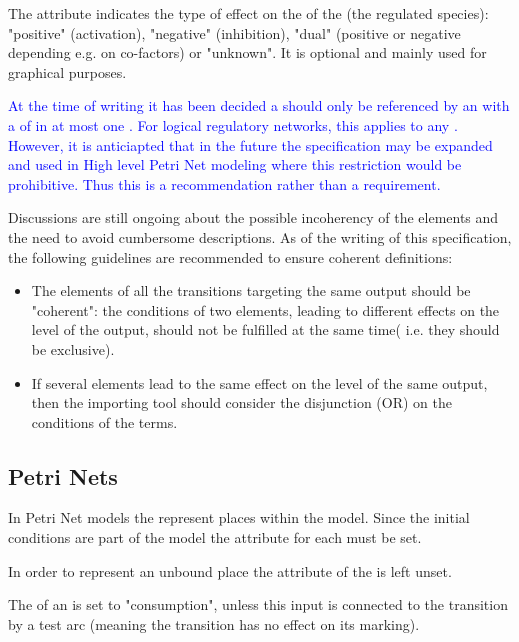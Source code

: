 The  attribute indicates the type of effect on the \Output of the \Transition (the regulated species): "positive" (activation), "negative" (inhibition), "dual" (positive or negative depending e.g. on co-factors) or "unknown". It is optional and mainly used for graphical purposes.


\textcolor{blue}{At the time of writing it has been decided a \QualitativeSpecies should only be referenced by an \Output with a  of   in at most one \Transition. For logical regulatory networks, this applies to any \Output.  However, it is anticiapted that in the future the specification may be expanded and used in High level Petri Net modeling where this restriction would be prohibitive. Thus this is a recommendation rather than a requirement.  }


Discussions are still ongoing about the possible incoherency of the  elements and the need to avoid cumbersome descriptions. As of the writing of this specification, the following guidelines are recommended to ensure coherent definitions:
\begin{itemize}
\item The  elements of all the transitions targeting the same output should be "coherent": the conditions of two  elements, leading to different effects on the level of the output, should not be fulfilled at the same time( i.e. they should be exclusive).
\item If several  elements lead to the same effect on the level of the same output, then the importing tool should consider the disjunction (OR) on the conditions of the terms. 
\end{itemize}
 
\subsection{Petri Nets}

In Petri Net models the \QualitativeSpecies represent places within the model. Since the initial conditions are part of the model the  attribute for each \QualitativeSpecies must be set.

In order to represent an unbound place the  attribute of the \QualitativeSpecies is left unset.

The  of an  is set to "consumption", unless this input is connected to the transition by a test arc (meaning the transition has no effect on its marking). 

